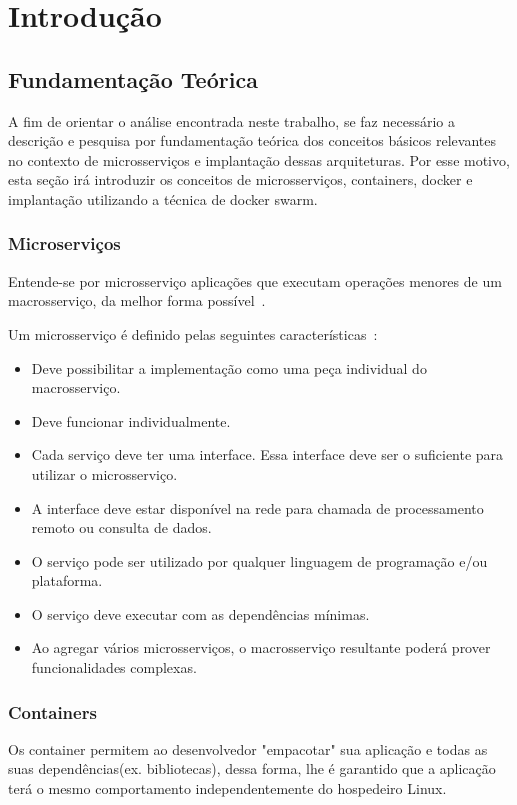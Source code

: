 \chapter{Introdução}
\label{cap1}


\section{Fundamentação Teórica}


A fim de orientar o análise encontrada neste trabalho, se faz necessário a descrição e pesquisa por fundamentação teórica dos conceitos básicos relevantes no contexto de microsserviços e implantação dessas arquiteturas.
%
Por esse motivo, esta seção irá introduzir os conceitos de microsserviços, containers, docker e implantação utilizando a técnica de docker swarm.


\subsection{Microserviços}
Entende-se por microsserviço aplicações que executam operações menores de um macrosserviço, da melhor forma possível~\cite{stephenclarkewillson2017, Newman2015Feb}.

Um microsserviço é definido pelas seguintes características~\cite{8169955}:


\begin{itemize}
  \item Deve possibilitar a implementação como uma peça individual do macrosserviço.
  \item Deve funcionar individualmente.
  \item Cada serviço deve ter uma interface. Essa interface deve ser o suficiente para utilizar o microsserviço.
  \item A interface deve estar disponível na rede para chamada de processamento remoto ou consulta de dados.
  \item O serviço pode ser utilizado por qualquer linguagem de programação e/ou plataforma.
  \item O serviço deve executar com as dependências mínimas.
  \item Ao agregar vários microsserviços, o macrosserviço resultante poderá prover funcionalidades complexas.
\end{itemize}



\subsection{Containers}
Os container permitem ao desenvolvedor "empacotar" sua aplicação e todas as suas dependências(ex. bibliotecas), dessa forma, lhe é garantido que a aplicação terá o mesmo comportamento independentemente do hospedeiro Linux.

